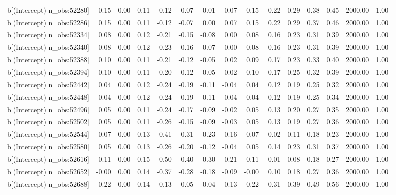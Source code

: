 \begin{table}[ht]
\begin{tabular}{rrrrrrrrrrrrrrr}
  b[(Intercept) n\_obs:52280] & 0.15 & 0.00 & 0.11 & -0.12 & -0.07 & 0.01 & 0.07 & 0.15 & 0.22 & 0.29 & 0.38 & 0.45 & 2000.00 & 1.00 \\ 
  b[(Intercept) n\_obs:52286] & 0.15 & 0.00 & 0.11 & -0.12 & -0.07 & 0.00 & 0.07 & 0.15 & 0.22 & 0.29 & 0.37 & 0.46 & 2000.00 & 1.00 \\ 
  b[(Intercept) n\_obs:52334] & 0.08 & 0.00 & 0.12 & -0.21 & -0.15 & -0.08 & 0.00 & 0.08 & 0.16 & 0.23 & 0.31 & 0.39 & 2000.00 & 1.00 \\ 
  b[(Intercept) n\_obs:52340] & 0.08 & 0.00 & 0.12 & -0.23 & -0.16 & -0.07 & -0.00 & 0.08 & 0.16 & 0.23 & 0.31 & 0.39 & 2000.00 & 1.00 \\ 
  b[(Intercept) n\_obs:52388] & 0.10 & 0.00 & 0.11 & -0.21 & -0.12 & -0.05 & 0.02 & 0.09 & 0.17 & 0.23 & 0.33 & 0.40 & 2000.00 & 1.00 \\ 
  b[(Intercept) n\_obs:52394] & 0.10 & 0.00 & 0.11 & -0.20 & -0.12 & -0.05 & 0.02 & 0.10 & 0.17 & 0.25 & 0.32 & 0.39 & 2000.00 & 1.00 \\ 
  b[(Intercept) n\_obs:52442] & 0.04 & 0.00 & 0.12 & -0.24 & -0.19 & -0.11 & -0.04 & 0.04 & 0.12 & 0.19 & 0.25 & 0.32 & 2000.00 & 1.00 \\ 
  b[(Intercept) n\_obs:52448] & 0.04 & 0.00 & 0.12 & -0.24 & -0.19 & -0.11 & -0.04 & 0.04 & 0.12 & 0.19 & 0.25 & 0.34 & 2000.00 & 1.00 \\ 
  b[(Intercept) n\_obs:52496] & 0.05 & 0.00 & 0.11 & -0.24 & -0.17 & -0.09 & -0.02 & 0.05 & 0.13 & 0.20 & 0.27 & 0.35 & 2000.00 & 1.00 \\ 
  b[(Intercept) n\_obs:52502] & 0.05 & 0.00 & 0.11 & -0.26 & -0.15 & -0.09 & -0.03 & 0.05 & 0.13 & 0.19 & 0.27 & 0.36 & 2000.00 & 1.00 \\ 
  b[(Intercept) n\_obs:52544] & -0.07 & 0.00 & 0.13 & -0.41 & -0.31 & -0.23 & -0.16 & -0.07 & 0.02 & 0.11 & 0.18 & 0.23 & 2000.00 & 1.00 \\ 
  b[(Intercept) n\_obs:52580] & 0.05 & 0.00 & 0.13 & -0.26 & -0.20 & -0.12 & -0.04 & 0.05 & 0.14 & 0.23 & 0.31 & 0.37 & 2000.00 & 1.00 \\ 
  b[(Intercept) n\_obs:52616] & -0.11 & 0.00 & 0.15 & -0.50 & -0.40 & -0.30 & -0.21 & -0.11 & -0.01 & 0.08 & 0.18 & 0.27 & 2000.00 & 1.00 \\ 
  b[(Intercept) n\_obs:52652] & -0.00 & 0.00 & 0.14 & -0.37 & -0.28 & -0.18 & -0.09 & -0.00 & 0.10 & 0.18 & 0.27 & 0.36 & 2000.00 & 1.00 \\ 
  b[(Intercept) n\_obs:52688] & 0.22 & 0.00 & 0.14 & -0.13 & -0.05 & 0.04 & 0.13 & 0.22 & 0.31 & 0.39 & 0.49 & 0.56 & 2000.00 & 1.00 \\ 

\end{tabular}
\end{table}
